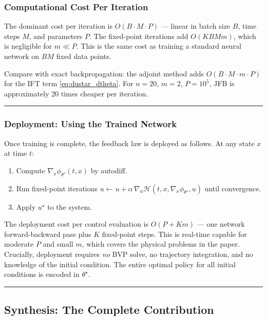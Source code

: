 \documentclass{article}
\begin{document}
\subsubsection{Computational Cost Per Iteration}

The dominant cost per iteration is $O(B \cdot M \cdot P)$ --- linear in batch
size $B$, time steps $M$, and parameters $P$. The fixed-point iterations add
$O(KBMm)$, which is negligible for $m \ll P$. This is the same cost as
training a standard neural network on $BM$ fixed data points.

Compare with exact backpropagation: the adjoint method adds
$O(B \cdot M \cdot m \cdot P)$ for the IFT term \eqref{eq:dustar_dtheta}.
For $n = 20$, $m = 2$, $P = 10^5$, JFB is approximately 20 times cheaper
per iteration.

\medskip\hrule\medskip

\subsubsection{Deployment: Using the Trained Network}

Once training is complete, the feedback law is deployed as follows. At any
state $x$ at time $t$:

\begin{enumerate}
    \item Compute $\nabla_x\phi_{\theta^\star}(t,x)$ by autodiff.
    \item Run fixed-point iterations $u \leftarrow u + \alpha\,
          \nabla_u\mathcal{H}(t,x,\nabla_x\phi_{\theta^\star},u)$ until convergence.
    \item Apply $u^\star$ to the system.
\end{enumerate}

The deployment cost per control evaluation is $O(P + Km)$ --- one network
forward-backward pass plus $K$ fixed-point steps. This is real-time capable for
moderate $P$ and small $m$, which covers the physical problems in the paper.
Crucially, deployment requires \textit{no} BVP solve, no trajectory
integration, and no knowledge of the initial condition. The entire optimal
policy for all initial conditions is encoded in $\theta^\star$.

\medskip

\hrule

\subsection{Synthesis: The Complete Contribution}
\label{sec:synthesis}
\end{document}
